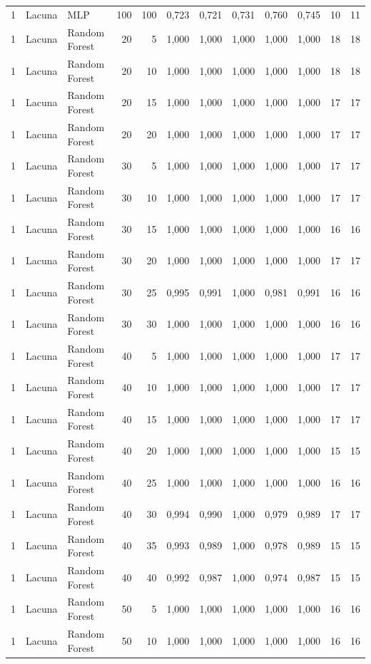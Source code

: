 \begin{longtable}{@{}rllrrrrrrrrr@{}}
1 & Lacuna & MLP & 100 & 100 & 0,723 & 0,721 & 0,731 & 0,760 & 0,745 & 10 & 11 \\
1 & Lacuna & Random Forest & 20 & 5 & 1,000 & 1,000 & 1,000 & 1,000 & 1,000 & 18 & 18 \\
1 & Lacuna & Random Forest & 20 & 10 & 1,000 & 1,000 & 1,000 & 1,000 & 1,000 & 18 & 18 \\
1 & Lacuna & Random Forest & 20 & 15 & 1,000 & 1,000 & 1,000 & 1,000 & 1,000 & 17 & 17 \\
1 & Lacuna & Random Forest & 20 & 20 & 1,000 & 1,000 & 1,000 & 1,000 & 1,000 & 17 & 17 \\
1 & Lacuna & Random Forest & 30 & 5 & 1,000 & 1,000 & 1,000 & 1,000 & 1,000 & 17 & 17 \\
1 & Lacuna & Random Forest & 30 & 10 & 1,000 & 1,000 & 1,000 & 1,000 & 1,000 & 17 & 17 \\
1 & Lacuna & Random Forest & 30 & 15 & 1,000 & 1,000 & 1,000 & 1,000 & 1,000 & 16 & 16 \\
1 & Lacuna & Random Forest & 30 & 20 & 1,000 & 1,000 & 1,000 & 1,000 & 1,000 & 17 & 17 \\
1 & Lacuna & Random Forest & 30 & 25 & 0,995 & 0,991 & 1,000 & 0,981 & 0,991 & 16 & 16 \\
1 & Lacuna & Random Forest & 30 & 30 & 1,000 & 1,000 & 1,000 & 1,000 & 1,000 & 16 & 16 \\
1 & Lacuna & Random Forest & 40 & 5 & 1,000 & 1,000 & 1,000 & 1,000 & 1,000 & 17 & 17 \\
1 & Lacuna & Random Forest & 40 & 10 & 1,000 & 1,000 & 1,000 & 1,000 & 1,000 & 17 & 17 \\
1 & Lacuna & Random Forest & 40 & 15 & 1,000 & 1,000 & 1,000 & 1,000 & 1,000 & 17 & 17 \\
1 & Lacuna & Random Forest & 40 & 20 & 1,000 & 1,000 & 1,000 & 1,000 & 1,000 & 15 & 15 \\
1 & Lacuna & Random Forest & 40 & 25 & 1,000 & 1,000 & 1,000 & 1,000 & 1,000 & 16 & 16 \\
1 & Lacuna & Random Forest & 40 & 30 & 0,994 & 0,990 & 1,000 & 0,979 & 0,989 & 17 & 17 \\
1 & Lacuna & Random Forest & 40 & 35 & 0,993 & 0,989 & 1,000 & 0,978 & 0,989 & 15 & 15 \\
1 & Lacuna & Random Forest & 40 & 40 & 0,992 & 0,987 & 1,000 & 0,974 & 0,987 & 15 & 15 \\
1 & Lacuna & Random Forest & 50 & 5 & 1,000 & 1,000 & 1,000 & 1,000 & 1,000 & 16 & 16 \\
1 & Lacuna & Random Forest & 50 & 10 & 1,000 & 1,000 & 1,000 & 1,000 & 1,000 & 16 & 16 \\

\end{longtable}
